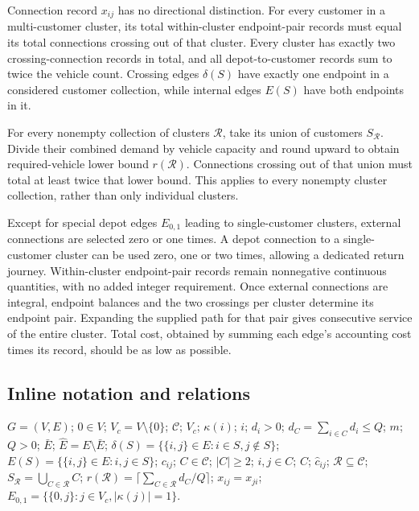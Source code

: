 \documentclass[10pt]{article}
\begin{document}
Connection record $x_{ij}$ has no directional distinction. For every customer in a multi-customer cluster, its total within-cluster endpoint-pair records must equal its total connections crossing out of that cluster. Every cluster has exactly two crossing-connection records in total, and all depot-to-customer records sum to twice the vehicle count. Crossing edges $\delta(S)$ have exactly one endpoint in a considered customer collection, while internal edges $E(S)$ have both endpoints in it.

For every nonempty collection of clusters $\mathcal R$, take its union of customers $S_{\mathcal R}$. Divide their combined demand by vehicle capacity and round upward to obtain required-vehicle lower bound $r(\mathcal R)$. Connections crossing out of that union must total at least twice that lower bound. This applies to every nonempty cluster collection, rather than only individual clusters.

Except for special depot edges $E_{0,1}$ leading to single-customer clusters, external connections are selected zero or one times. A depot connection to a single-customer cluster can be used zero, one or two times, allowing a dedicated return journey. Within-cluster endpoint-pair records remain nonnegative continuous quantities, with no added integer requirement. Once external connections are integral, endpoint balances and the two crossings per cluster determine its endpoint pair. Expanding the supplied path for that pair gives consecutive service of the entire cluster. Total cost, obtained by summing each edge's accounting cost times its record, should be as low as possible.

\subsection*{Inline notation and relations}
$G=(V,E)$; $0\in V$; $V_c=V\setminus\{0\}$; $\mathcal C$; $V_c$; $\kappa(i)$; $i$; $d_i>0$; $d_C=\sum_{i\in C}d_i\le Q$; $m$; $Q>0$; $\bar E$; $\hat E=E\setminus\bar E$; $\delta(S)=\{\{i,j\}\in E:i\in S,j\notin S\}$; $E(S)=\{\{i,j\}\in E:i,j\in S\}$; $c_{ij}$; $C\in\mathcal C$; $|C|\ge2$; $i,j\in C$; $C$; $\hat c_{ij}$; $\mathcal R\subseteq\mathcal C$; $S_{\mathcal R}=\bigcup_{C\in\mathcal R}C$; $r(\mathcal R)=\lceil\sum_{C\in\mathcal R}d_C/Q\rceil$; $x_{ij}=x_{ji}$; $E_{0,1}=\{\{0,j\}:j\in V_c,|\kappa(j)|=1\}$.
\end{document}
